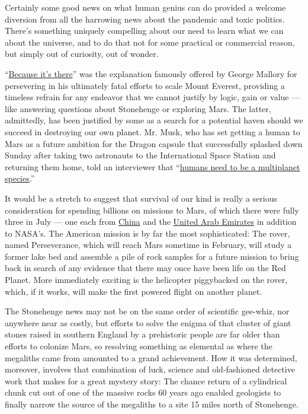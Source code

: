 Certainly some good news on what human genius can do provided a welcome
diversion from all the harrowing news about the pandemic and toxic
politics. There's something uniquely compelling about our need to learn
what we can about the universe, and to do that not for some practical or
commercial reason, but simply out of curiosity, out of wonder.

``\href{https://www.nytimes.com/1923/03/18/archives/climbing-mount-everest-is-work-for-supermen-a-member-of-former.html}{Because
it's there}'' was the explanation famously offered by George Mallory for
persevering in his ultimately fatal efforts to scale Mount Everest,
providing a timeless refrain for any endeavor that we cannot justify by
logic, gain or value --- like answering questions about Stonehenge or
exploring Mars. The latter, admittedly, has been justified by some as a
search for a potential haven should we succeed in destroying our own
planet. Mr. Musk, who has set getting a human to Mars as a future
ambition for the Dragon capsule that successfully splashed down Sunday
after taking two astronauts to the International Space Station and
returning them home, told an interviewer that
``\href{https://slate.com/technology/2015/04/elon-musk-and-mars-spacex-ceo-and-our-multiplanet-species.html}{humans
need to be a multiplanet species}.''

It would be a stretch to suggest that survival of our kind is really a
serious consideration for spending billions on missions to Mars, of
which there were fully three in July --- one each from
\href{https://www.nature.com/articles/d41586-020-02187-7}{China} and the
\href{https://www.cnn.com/2020/07/19/middleeast/uae-mars-hope-launch-intl-hnk-scn-scli/index.html}{United
Arab Emirates} in addition to NASA's. The American mission is by far the
most sophisticated: The rover, named Perseverance, which will reach Mars
sometime in February, will study a former lake bed and assemble a pile
of rock samples for a future mission to bring back in search of any
evidence that there may once have been life on the Red Planet. More
immediately exciting is the helicopter piggybacked on the rover, which,
if it works, will make the first powered flight on another planet.

The Stonehenge news may not be on the same order of scientific gee-whiz,
nor anywhere near as costly, but efforts to solve the enigma of that
cluster of giant stones raised in southern England by a prehistoric
people are far older than efforts to colonize Mars, so resolving
something as elemental as where the megaliths came from amounted to a
grand achievement. How it was determined, moreover, involves that
combination of luck, science and old-fashioned detective work that makes
for a great mystery story: The chance return of a cylindrical chunk cut
out of one of the massive rocks 60 years ago enabled geologists to
finally narrow the source of the megaliths to a site 15 miles north of
Stonehenge.

